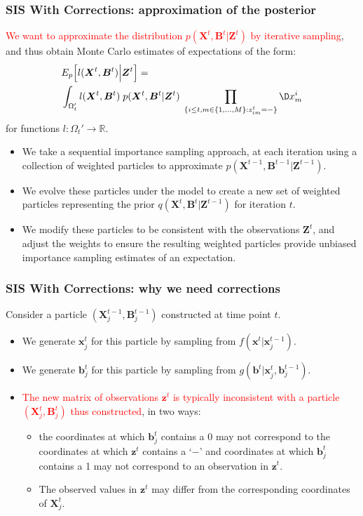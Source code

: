 \documentclass[9pt, xcolor={dvipsnames,svgnames,table}]{beamer}
\newcommand{\Real}{\mathbb R}
\begin{document}
\begin{frame}
    \frametitle{SIS With Corrections: approximation of the posterior}
   \textcolor{Red}{ We want to approximate the distribution $p(\bm{X}^{t}, \bm{B}^{t} | \bm{Z}^{t})$ by iterative sampling}, and thus obtain Monte Carlo estimates of expectations of the form:
    \begin{align*}
        &E_{p} \Big[l(\bm{X}^{t}, \bm{B}^{t} ) \Big| \bm{Z}^{t} \Big] = \\
        &\int_{\Omega_t'} l(\bm{X}^{t}, \bm{B}^{t})\; p(\bm{X}^{t}, \bm{B}^{t} | \bm{Z}^{t})\; \prod_{ \{ i \leq t, m \in \{1, \ldots, M \} : z^t_{im} = - \} } \D x^i_m
    \end{align*}
    for functions $l: \Omega_t' \rightarrow \Real$. 
    \begin{itemize}
        \item We take a sequential importance sampling approach, at each iteration using a collection of weighted particles to approximate $p(\bm{X}^{t-1}, \bm{B}^{t-1} | \bm{Z}^{t-1})$.
        \item We evolve these particles under the model to create a new set of weighted particles representing the prior $q(\bm{X}^{t}, \bm{B}^{t} | \bm{Z}^{t-1})$ for iteration $t$.
        \item We modify these particles to be consistent with the observations $\bm{Z}^{t}$, and adjust the weights to ensure the resulting weighted particles provide unbiased importance sampling estimates of an expectation.
    \end{itemize}
\end{frame}






\begin{frame}
    \frametitle{SIS With Corrections: why we need corrections}
    Consider a particle $(\bm{X}^{t-1}_j,\bm{B}^{t-1}_j)$ constructed at time point $t$.
    \begin{itemize}
        \item We generate $\bm{x}^t_j$ for this particle by sampling from $f(\bm{x}^t | \bm{x}^{t-1}_j)$.
        \item We generate $\bm{b}^{t}_j$ for this particle by sampling from $g(\bm{b}^{t} | \bm{x}^t_j, \bm{b}^{t-1}_j)$.
        \item \textcolor{Red}{The new matrix of observations $\bm{z}^{t}$ is typically inconsistent with a particle $(\bm{X}^{t}_j, \bm{B}^{t}_j)$ thus constructed}, in two ways:
        \begin{itemize}
            \item the coordinates at which $\bm{b}^{t}_j$ contains a 0 may not correspond to the coordinates at which $\bm{z}^{t}$ contains a `$-$' and coordinates at which $\bm{b}^{t}_j$ contains a 1 may not correspond to an observation in $\bm{z}^{t}$.
            \item The observed values in $\bm{z}^{t}$ may differ from the corresponding coordinates of $\bm{X}^{t}_j$.
        \end{itemize}
    \end{itemize}
\end{frame}
    
\end{document}
